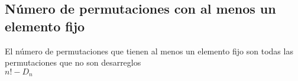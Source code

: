 \subsection{Número de permutaciones con al menos un elemento fijo}
El número de permutaciones que tienen al menos un elemento fijo son todas las permutaciones que no son desarreglos\\
$n!-D_{n}$
